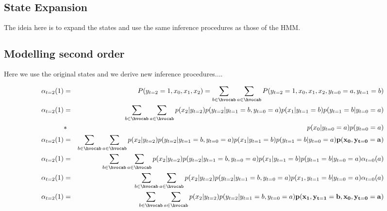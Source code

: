 
\subsection{State Expansion}

The ideia here is to expand the states and use the same inference
procedures as those of the HMM.



\subsection{Modelling second order}

Here we use the original states and we derive new inference procedures....

\begin{eqnarray*}
\alpha_{t=2}(1) &=& P(y_{t=2} = 1,x_0,x_1,x_2) = \sum_{b \in \hvocab}
\sum_{a\in \hvocab} P(y_{t=2} = 1,x_0,x_1,x_2, y_{t=0}=a,y_{t=1}=b)\\
\alpha_{t=2}(1) &=& \sum_{b \in \hvocab}
\sum_{a\in \hvocab}
p(x_2 |  y_{t=2}) p(y_{t=2} | y_{t=1} =b ,y_{t=0}=a)  p(x_1 |  y_{t=1}
=b) p(y_{t=1} =b| y_{t=0}=a)\\
&*&  p(x_0 |  y_{t=0}=a) p(y_{t=0}=a) \\
\alpha_{t=2}(1) &=& \sum_{b \in \hvocab}
\sum_{a\in \hvocab}
p(x_2 |  y_{t=2}) p(y_{t=2} | y_{t=1} = b,y_{t=0} = a)  p(x_1 |
y_{t=1} = b) p(y_{t=1} = b| y_{t=0} = a)  \mathbf{p(x_0 ,  y_{t=0} = a) }\\
\alpha_{t=2}(1) &=& \sum_{b \in \hvocab}
\sum_{a\in \hvocab}
p(x_2 |  y_{t=2}) p(y_{t=2} | y_{t=1} = b,y_{t=0} = a)  p(x_1 |
y_{t=1} = b) p(y_{t=1} = b| y_{t=0} = a)  \alpha_{t=0}(a) \\
\alpha_{t=2}(1) &=& \sum_{b \in \hvocab}
\sum_{a\in \hvocab}
p(x_2 |  y_{t=2}) p(y_{t=2} | y_{t=1} = b,y_{t=0} = a)  p(x_1 ,
y_{t=1} = b | y_{t=0} = a)  \alpha_{t=0}(a) \\
\alpha_{t=2}(1) &=& \sum_{b \in \hvocab}
\sum_{a\in \hvocab}
p(x_2 |  y_{t=2}) p(y_{t=2} | y_{t=1} = b,y_{t=0} = a)  \mathbf{p(x_1 ,
y_{t=1} = b ,x_0 ,  y_{t=0} = a) }
\end{eqnarray*}

